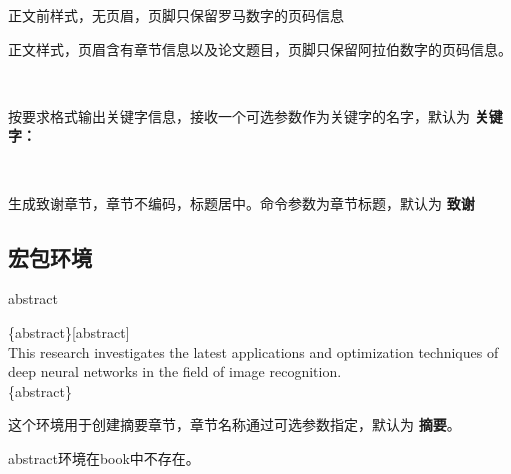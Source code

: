 \documentclass{ctxdoc}
\begin{document}
    \begin{function}[added=2024-08-18]{\frontmatter}
        \begin{syntax}
        \end{syntax}
        正文前样式，无页眉，页脚只保留罗马数字的页码信息
    \end{function}

    \begin{function}[added=2024-08-18]{\mainmatter}
        \begin{syntax}
        \end{syntax}
        正文样式，页眉含有章节信息以及论文题目，页脚只保留阿拉伯数字的页码信息。
    \end{function}


    \begin{function}[added=2024-08-18]{\keywords}
        \begin{syntax}
            \\
        \end{syntax}
        按要求格式输出关键字信息，接收一个可选参数作为关键字的名字，默认为 \textbf{关键字：}
    \end{function}



    \begin{function}[added=2024-08-18]{\acknowledgments}
        \begin{syntax}
            \\
        \end{syntax}
        生成致谢章节，章节不编码，标题居中。命令参数为章节标题，默认为 \textbf{致谢}
    \end{function}

    \subsection{宏包环境}

    \begin{environment}{abstract}
        \begin{syntax}
            \{abstract\}[abstract] \\
            This research investigates the latest applications and optimization techniques
            of deep neural networks in the field of image recognition. \\
            \{abstract\}
        \end{syntax}
        这个环境用于创建摘要章节，章节名称通过可选参数指定，默认为 \textbf{摘要}。
        \begin{texnote}
            abstract环境在book中不存在。
        \end{texnote}
    \end{environment}
\end{document}
